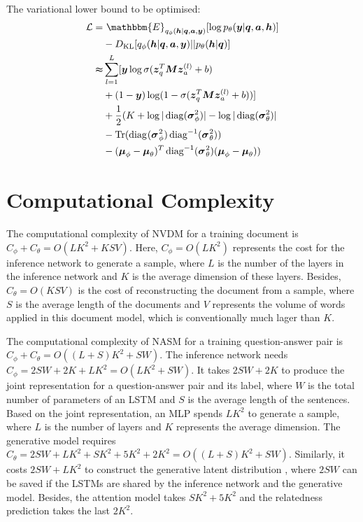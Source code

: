 \documentclass{article}
\newcommand{\nobracket}{}
\newcommand{\tmmathbf}[1]{\ensuremath{\boldsymbol{#1}}}
\newcommand{\tmop}[1]{\ensuremath{\operatorname{#1}}}
\begin{document}
\begin{appendices}
The variational lower bound to be optimised:
\begin{align}
  \nonumber \mathcal{L}  = & \  \mathbbm{E}_{q_{\phi} ( \tmmathbf{h} | \tmmathbf{q},
  \tmmathbf{a}, \tmmathbf{y} \nobracket)} [ \log p_{\theta} ( \tmmathbf{y} |
  \tmmathbf{q}, \tmmathbf{a}, \tmmathbf{h} \nobracket)] \\
  & - D_{\tmop{KL}} [q_{\phi} ( \tmmathbf{h} | \tmmathbf{q}, \tmmathbf{a}, \tmmathbf{y}
  \nobracket) | | p_{\theta} ( \tmmathbf{h} | \tmmathbf{q} )]\\
  \nonumber \thickapprox & \sum_{l = 1}^L [ \tmmathbf{y} \log \sigma ( \tmmathbf{z}_q^T
  \tmmathbf{M}\tmmathbf{z}_a^{(l)} + b) \\
  \nonumber & + ( 1 -\tmmathbf{y}) \log ( 1 - \sigma (
  \tmmathbf{z}_q^T \tmmathbf{M}\tmmathbf{z}_a^{(l)} + b)) ] \\
  \nonumber &   + \frac{1}{2}  (K + \log | \tmop{diag} ( \tmmathbf{\sigma}_{\phi}^2) | -
  \log | \tmop{diag} ( \tmmathbf{\sigma}_{\theta}^2) | \\
  & - \tmop{Tr} (
  \tmop{diag}^{} ( \tmmathbf{\sigma^{}}^2_{\phi}) \tmop{diag}^{- 1} (
  \tmmathbf{\sigma^{}}^2_{\theta}))  \nonumber \\
  & - ( \tmmathbf{\mu}_{\phi} -
  \tmmathbf{\mu}_{\theta})^T \tmop{diag}^{- 1} (
  \tmmathbf{\sigma^{}}^2_{\theta}) ( \tmmathbf{\mu}_{\phi} -
  \tmmathbf{\mu}_{\theta}))
\end{align}

\newpage

\section{Computational Complexity}
\label{app:c}
The computational complexity of NVDM for a training document is $C_\phi+C_\theta=O(LK^2+KSV)$. Here, $C_\phi=O(LK^2)$ represents the cost for the inference network to generate a sample, where $L$ is the number of the layers in the inference network and $K$ is the average dimension of these layers. Besides, $C_\theta=O(KSV)$ is the cost of reconstructing the document from a sample, where $S$ is the average length of the documents and $V$ represents the volume of words applied in this document model, which is conventionally much lager than $K$.

The computational complexity of NASM for a training question-answer pair is $C_\phi+C_\theta=O((L+S)K^2+SW)$. 
The inference network needs $C_\phi=2SW+2K+LK^2=O(LK^2+SW)$.
It takes $2SW+2K$ to produce the joint representation for a question-answer pair and its label, where $W$ is the total  number of parameters of an LSTM and $S$ is the average length of the sentences. Based on the joint representation, an MLP spends $LK^2$ to generate a sample, where $L$ is the number of layers and $K$ represents the average dimension. 
The generative model requires  $C_\theta=2SW+LK^2+SK^2+5K^2+2K^2=O((L+S)K^2+SW)$. 
Similarly, it costs $2SW+LK^2$ to construct the generative latent distribution , where $2SW$ can be saved if the LSTMs are shared by the inference network and the generative model. Besides, the attention model takes $SK^2+5K^2$ and the relatedness prediction takes the last $2K^2$. 


\end{appendices}
\end{document}
